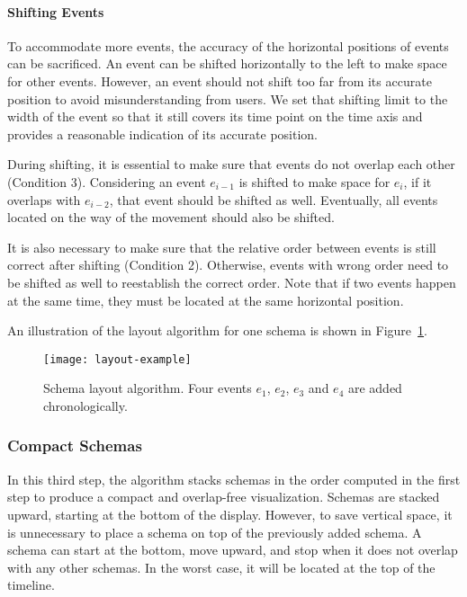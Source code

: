 \paragraph*{Shifting Events}
To accommodate more events, the accuracy of the horizontal positions of events can be sacrificed. An event can be shifted horizontally to the left to make space for other events. However, an event should not shift too far from its accurate position to avoid misunderstanding from users. We set that shifting limit to the width of the event so that it still covers its time point on the time axis and provides a reasonable indication of its accurate position. 

During shifting, it is essential to make sure that events do not overlap each other (Condition 3). Considering an event $e_{i-1}$ is shifted to make space for $e_i$, if it overlaps with $e_{i-2}$, that event should be shifted as well. Eventually, all events located on the way of the movement should also be shifted.

It is also necessary to make sure that the relative order between events is still correct after shifting (Condition 2). Otherwise, events with wrong order need to be shifted as well to reestablish the correct order. Note that if two events happen at the same time, they must be located at the same horizontal position. 

An illustration of the layout algorithm for one schema is shown in Figure~\ref{fig:layout-schema-example}.

\begin{figure}[!htb]
	\centering
	\texttt{[image: layout-example]}
	\caption{Schema layout algorithm. Four events $e_1$, $e_2$, $e_3$ and $e_4$ are added chronologically.}
	\label{fig:layout-schema-example}
\end{figure}

\subsubsection{Compact Schemas}
In this third step, the algorithm stacks schemas in the order computed in the first step to produce a compact and overlap-free visualization. Schemas are stacked upward, starting at the bottom of the display. However, to save vertical space, it is unnecessary to place a schema on top of the previously added schema. A schema can start at the bottom, move upward, and stop when it does not overlap with any other schemas. In the worst case, it will be located at the top of the timeline.

